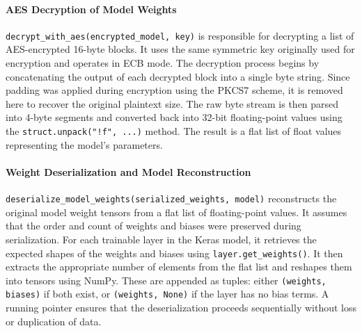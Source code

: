 \documentclass[10pt]{article}
\begin{document}
\paragraph{AES Decryption of Model Weights}
\texttt{decrypt\_with\_aes(encrypted\_model, key)} is responsible for decrypting a list of AES-encrypted 16-byte blocks. It uses the same symmetric key originally used for encryption and operates in ECB mode. The decryption process begins by concatenating the output of each decrypted block into a single byte string. Since padding was applied during encryption using the PKCS7 scheme, it is removed here to recover the original plaintext size. The raw byte stream is then parsed into 4-byte segments and converted back into 32-bit floating-point values using the \texttt{struct.unpack("!f", ...)} method. The result is a flat list of float values representing the model's parameters.
\paragraph{Weight Deserialization and Model Reconstruction}
\texttt{deserialize\_model\_weights(serialized\_weights, model)} reconstructs the original model weight tensors from a flat list of floating-point values. It assumes that the order and count of weights and biases were preserved during serialization. For each trainable layer in the Keras model, it retrieves the expected shapes of the weights and biases using \texttt{layer.get\_weights()}. It then extracts the appropriate number of elements from the flat list and reshapes them into tensors using NumPy. These are appended as tuples: either \texttt{(weights, biases)} if both exist, or \texttt{(weights, None)} if the layer has no bias terms. A running pointer ensures that the deserialization proceeds sequentially without loss or duplication of data.
\end{document}
